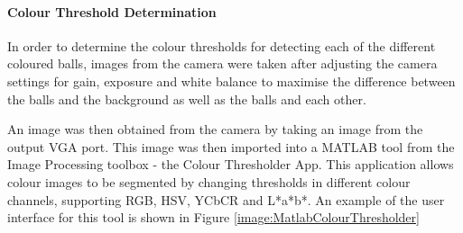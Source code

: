 \documentclass[a4paper]{article}
\begin{document}
\paragraph*{Colour Threshold Determination}
\vspace{-6pt}

In order to determine the colour thresholds for detecting each of the different 
coloured balls, images from the camera were taken after adjusting the camera settings
for gain, exposure and white balance to maximise the difference between the balls 
and the background as well as the balls and each other.  

An image was then obtained from the camera by taking an image from the output VGA 
port. This image was then imported into a MATLAB tool from the Image Processing toolbox - 
the Colour Thresholder App. This application allows colour images to be segmented by changing
thresholds in different colour channels, supporting RGB, HSV, YCbCR and L*a*b*. An example of 
the user interface for this tool is shown in Figure \ref{image:MatlabColourThresholder}
\end{document}
